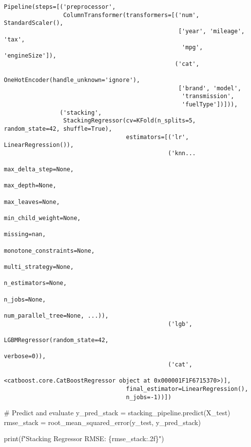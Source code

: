 \documentclass[
  letterpaper,
  DIV=11,
  numbers=noendperiod]{scrreprt}
\newenvironment{Shaded}{\begin{snugshade}}{\end{snugshade}}
\newcommand{\BuiltInTok}[1]{\textcolor[rgb]{0.00,0.23,0.31}{#1}}
\newcommand{\CommentTok}[1]{\textcolor[rgb]{0.37,0.37,0.37}{#1}}
\newcommand{\NormalTok}[1]{\textcolor[rgb]{0.00,0.23,0.31}{#1}}
\newcommand{\OperatorTok}[1]{\textcolor[rgb]{0.37,0.37,0.37}{#1}}
\newcommand{\SpecialCharTok}[1]{\textcolor[rgb]{0.37,0.37,0.37}{#1}}
\newcommand{\SpecialStringTok}[1]{\textcolor[rgb]{0.13,0.47,0.30}{#1}}
\begin{document}
\begin{verbatim}
Pipeline(steps=[('preprocessor',
                 ColumnTransformer(transformers=[('num', StandardScaler(),
                                                  ['year', 'mileage', 'tax',
                                                   'mpg', 'engineSize']),
                                                 ('cat',
                                                  OneHotEncoder(handle_unknown='ignore'),
                                                  ['brand', 'model',
                                                   'transmission',
                                                   'fuelType'])])),
                ('stacking',
                 StackingRegressor(cv=KFold(n_splits=5, random_state=42, shuffle=True),
                                   estimators=[('lr', LinearRegression()),
                                               ('knn...
                                                             max_delta_step=None,
                                                             max_depth=None,
                                                             max_leaves=None,
                                                             min_child_weight=None,
                                                             missing=nan,
                                                             monotone_constraints=None,
                                                             multi_strategy=None,
                                                             n_estimators=None,
                                                             n_jobs=None,
                                                             num_parallel_tree=None, ...)),
                                               ('lgb',
                                                LGBMRegressor(random_state=42,
                                                              verbose=0)),
                                               ('cat',
                                                <catboost.core.CatBoostRegressor object at 0x000001F1F6715370>)],
                                   final_estimator=LinearRegression(),
                                   n_jobs=-1))])
\end{verbatim}

\begin{Shaded}
\begin{Highlighting}[]
\CommentTok{\# Predict and evaluate}
\NormalTok{y\_pred\_stack }\OperatorTok{=}\NormalTok{ stacking\_pipeline.predict(X\_test)}
\NormalTok{rmse\_stack }\OperatorTok{=}\NormalTok{ root\_mean\_squared\_error(y\_test, y\_pred\_stack)}

\BuiltInTok{print}\NormalTok{(}\SpecialStringTok{f"Stacking Regressor RMSE: }\SpecialCharTok{\{}\NormalTok{rmse\_stack}\SpecialCharTok{:.2f\}}\SpecialStringTok{"}\NormalTok{)}
\end{Highlighting}
\end{Shaded}
\end{document}
